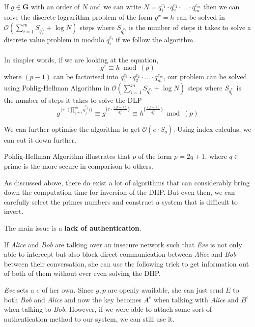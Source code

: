 		\begin{tcolorbox}[breakable, title=Pohlig-Hellman Algorithm, colback=blue!5!white,colframe=blue!75!black]
			If \(g\in \mathbf{G}\) with an order of \(N\) and we can write \(N = q_1^{e_1}\cdot q_2^{e_2}\cdot \ldots \cdot q_m^{e_m}\) then we can solve the discrete lograrithm problem of the form \(g^x = h\) can be solved in \(\mathcal{O}(\sum^m_{i=1}S_{q_i^{e_i}}+ \log N)\) steps where \(S_{q_i^{e_i}} \) is the number of steps it takes to solve a discrete value problem in modulo \(q_i^{e_i}\) if we follow the algorithm.\\~\\
			In simpler words, if we are looking at the equation, \[g^x \equiv h \bmod(p)\] where \((p-1)\) can be factorised into \(q_1^{e_1}\cdot q_2^{e_2}\cdot \ldots \cdot q_m^{e_m}\), our problem can be solved using Pohlig-Hellman Algorithm in \(\mathcal{O}(\sum^m_{i=1}S_{q_i^{e_i}}+ \log N)\) steps where \(S_{q_i^{e_i}} \) is the number of steps it takes to solve the DLP
			\[ g^{\bigg\{r\cdot \big(\prod_{j\not = i}^{m}q_j^{e_j}\big)\bigg\}}\equiv g^{\big\{r\cdot \frac{(p-1)}{q_i^{e_i}}\big\}}\equiv h^{\big\{\frac{(p-1)}{q_i^{e_i}}\big\}} \bmod(p)\]
		\end{tcolorbox}

		We can further optimise the algorithm to get \(\mathcal{O}(e\cdot S_q)\). Using index calculus, we can cut it down further.

		\begin{tcolorbox}
			Pohlig-Hellman Algorithm illustrates that $p$ of the form \(p = 2 q + 1\), where \(q \in\) prime is the more secure in comparison to others.
		\end{tcolorbox}

	\label{sec:whydiffiesucks}
		As discussed above, there do exist a lot of algorithms that can considerably bring down the computation time for inversion of the DHP. But even then, we can carefully select the primes numbers and construct a system that is difficult to invert.\par
		The main issue is a \textbf{lack of authentication}.\par
		If \emph{Alice} and \emph{Bob} are talking over an insecure network such that \emph{Eve} is not only able to intercept but also block direct communication between \emph{Alice} and \emph{Bob} between their conversation, she can use the following trick to get information out of both of them without ever even solving the DHP.

		\begin{tcolorbox}[title=Man in the Middle Attack, breakable, colback=yellow!5!white,colframe=yellow!75!black]
 			\emph{Eve} sets a \(e\) of her own. Since \(g, p\) are openly available, she can just send \(E\) to both \emph{Bob} and \emph{Alice} and now the key becomes \(A^e\) when talking with \emph{Alice} and \(B^e\) when talking to \emph{Bob}. However, if we were able to attach some sort of authentication method to our system, we can still use it.
		\end{tcolorbox}